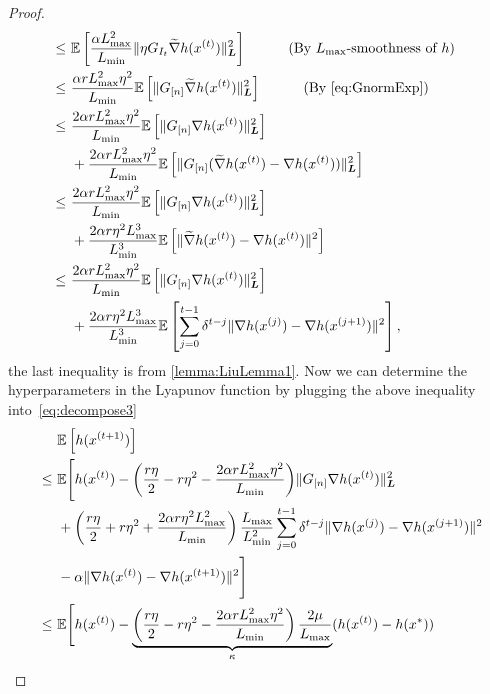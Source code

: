 \begin{proof}
\begin{align*}
        ~\leq~&  \mathbb{E} \left[ \frac{\alpha L_{\max}^2}{L_{\min}} \| \eta G_{I_t} \widetilde{\nabla} h( x^{(t)} )  \|_{\boldsymbol{L}}^2 \right]  \qquad \hbox{\quad(By $L_{\max}$-smoothness of $h$)\quad}  \\
        ~\leq~& \frac{\alpha r L_{\max}^2 \eta^2}{L_{\min}} \mathbb{E} \left[  \| G_{[n]} \widetilde{\nabla} h( x^{(t)} )  \|_{\boldsymbol{L}}^2 \right] \qquad \hbox{\quad(By \eqref{eq:GnormExp})\quad} \\
        ~\leq~&  \frac{2 \alpha r L_{\max}^2 \eta^2}{L_{\min}} \mathbb{E} \left[ \| G_{[n]} \nabla h( x^{(t)} ) \|^2_{\boldsymbol{L}} \right] \\
        &+ \frac{2 \alpha r L_{\max}^2 \eta^2}{L_{\min}} \mathbb{E} \left[  \| G_{[n]} ( \widetilde{\nabla} h( x^{(t)} ) - \nabla h( x^{(t)} ) ) \|^2_{\boldsymbol{L}}  \right] \\
        ~\leq~&  \frac{2 \alpha r L_{\max}^2 \eta^2}{L_{\min}} \mathbb{E} \left[ \| G_{[n]} \nabla h( x^{(t)} ) \|^2_{\boldsymbol{L}} \right] \\
        &+ \frac{2 \alpha r \eta^2 L_{\max}^3}{ L_{\min}^3 } \mathbb{E} \left[  \| \widetilde{\nabla} h( x^{(t)} ) - \nabla h( x^{(t)} ) \|^2  \right] \\
        ~\leq~& \frac{2 \alpha r L_{\max}^2 \eta^2}{L_{\min}} \mathbb{E} \left[ \| G_{[n]} \nabla h( x^{(t)} ) \|^2_{\boldsymbol{L}} \right] \\
        &+ \frac{2 \alpha r \eta^2 L_{\max}^3 }{ L_{\min}^3 }  \mathbb{E} \left[ \sum_{j=0}^{t-1} \delta^{t-j} \| \nabla h(x^{(j)}) - {\nabla} h(x^{(j+1)}) \|^2 \right],
    \end{align*}
    the last inequality is from \autoref{lemma:LiuLemma1}.
    Now we can determine the hyperparameters in the Lyapunov function by plugging the above inequality into~\autoref{eq:decompose3} 
    \begin{equation} \label{eq:recursion}
    \begin{split}
        &\mE\left[ h(x^{(t+1)}) \right] \\
        ~\leq~& \mE\Bigg[ h(x^{(t)}) - {\left( \frac{r \eta }{2} - r \eta^2 - \frac{2 \alpha r L_{\max}^2 \eta^2}{L_{\min}} \right)} \| G_{[n]} \nabla h(x^{(t)}) \|_{\bL}^2  \\
        &+ \left( \frac{r \eta}{2} + r \eta^2 + \frac{2 \alpha r \eta^2 L_{\max}^2}{ L_{\min} } \right) \frac{L_{\max}}{L_{\min}^2} \sum_{j=0}^{t-1} \delta^{t-j} \| \nabla h(x^{(j)}) - {\nabla} h(x^{(j+1)}) \|^2 \\
        &- \alpha \| \nabla h(x^{(t)}) - {\nabla} h(x^{(t+1)}) \|^2 \Bigg]  \\
        ~\leq~& \mE\Bigg[ h(x^{(t)}) - \underbrace{\left( \frac{r \eta }{2} - r \eta^2 - \frac{2 \alpha r L_{\max}^2 \eta^2}{L_{\min}} \right) \frac{2\mu}{ L_{\max}} }_{\kappa} ( h(x^{(t)}) - h(x^*) )  \\

\end{split}
\end{equation}
\end{proof}
